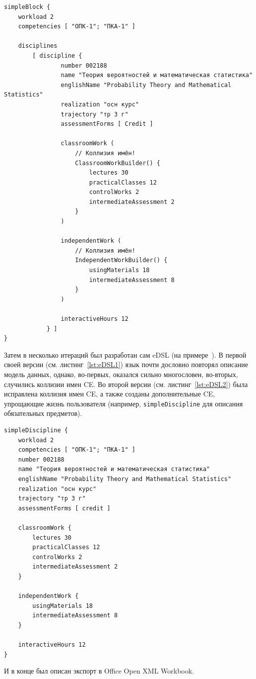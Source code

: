 \begin{listing}
      \begin{verbatim}
simpleBlock {
    workload 2
    competencies [ "ОПК-1"; "ПКА-1" ]

    disciplines
        [ discipline {
                number 002188
                name "Теория вероятностей и математическая статистика"
                englishName "Probability Theory and Mathematical Statistics"
                realization "осн курс"
                trajectory "тр 3 г"
                assessmentForms [ Credit ]

                classroomWork (
                    // Коллизия имён!
                    ClassroomWorkBuilder() {
                        lectures 30
                        practicalClasses 12
                        controlWorks 2
                        intermediateAssessment 2
                    }
                )

                independentWork (
                    // Коллизия имён!
                    IndependentWorkBuilder() {
                        usingMaterials 18
                        intermediateAssessment 8
                    }
                )

                interactiveHours 12
            } ]
}
      \end{verbatim}
      \caption{Описание обязательного предмета в первой версии eDSL}
      \label{lst:eDSL1}
\end{listing}

Затем в несколько итераций был разработан сам eDSL (на примере~\cite{CreatingDSLsUsing2022}).
В первой своей версии (см. листинг~\ref{lst:eDSL1}) язык почти дословно повторял описание модель данных, однако, во-первых, оказался сильно многословен, во-вторых, случились коллизии имен CE.
Во второй версии (см. листинг~\ref{lst:eDSL2}) была исправлена коллизия имен CE, а также созданы дополнительные CE, упрощающие жизнь пользователя (например, \texttt{simpleDiscipline} для описания обязательных предметов).

\begin{listing}
      \begin{verbatim}
simpleDiscipline {
    workload 2
    competencies [ "ОПК-1"; "ПКА-1" ]
    number 002188
    name "Теория вероятностей и математическая статистика"
    englishName "Probability Theory and Mathematical Statistics"
    realization "осн курс"
    trajectory "тр 3 г"
    assessmentForms [ credit ]

    classroomWork {
        lectures 30
        practicalClasses 12
        controlWorks 2
        intermediateAssessment 2
    }

    independentWork {
        usingMaterials 18
        intermediateAssessment 8
    }

    interactiveHours 12
}
      \end{verbatim}
      \caption{Описание обязательного предмета во второй версии eDSL}
      \label{lst:eDSL2}
\end{listing}

И в конце был описан экспорт в Office Open XML Workbook.
